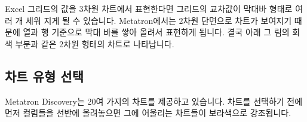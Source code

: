 \documentclass[letterpaper,10pt,english]{sphinxmanual}
\begin{document}
Excel 그리드의 값을 3차원 차트에서 표현한다면 그리드의 교차값이 막대바 형태로 여러 개 세워 지게 될 수 있습니다. Metatron에서는 2차원 단면으로 차트가 보여지기 때문에 열과 행 기준으로 막대 바를 쌓아 올려서 표현하게 됩니다.
결국 아래 그 림의 회색 부분과 같은 2차원 형태의 차트로 나타납니다.
\begin{quote}

\begin{figure}[H]
\centering

\noindent{}
\end{figure}
\end{quote}


\subsection{차트 유형 선택}
\label{\detokenize{discovery/part04/chart_types:id1}}\label{\detokenize{discovery/part04/chart_types::doc}}


Metatron Discovery는 20여 가지의 차트를 제공하고 있습니다. 차트를 선택하기 전에 먼저 컬럼들을 선반에 올려놓으면 그에 어울리는 차트들이 보라색으로 강조됩니다.
\begin{quote}

\begin{figure}[H]
\centering

\noindent{}
\end{figure}
\end{quote}
\end{document}
